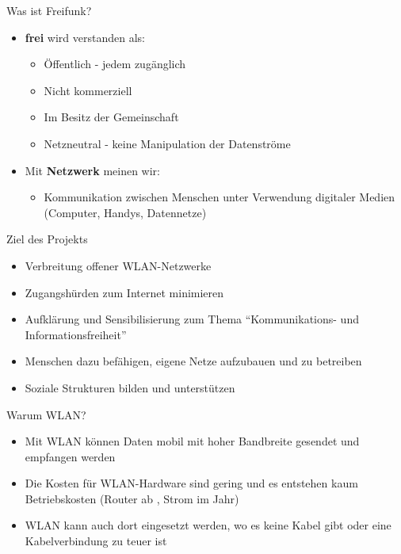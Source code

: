\documentclass[c]{beamer}
\begin{document}
\begin{frame}{Was ist Freifunk?}
\begin{itemize}
	\item \textbf{frei} wird verstanden als:
	\begin{itemize}
		\item Öffentlich - jedem zugänglich
		\item Nicht kommerziell
		\item Im Besitz der Gemeinschaft
		\item Netzneutral - keine Manipulation der Datenströme
	\end{itemize}
	\item Mit \textbf{Netzwerk} meinen wir:
	\begin{itemize}
		\item Kommunikation zwischen Menschen unter Verwendung digitaler Medien (Computer, Handys, Datennetze)
	\end{itemize}
  \end{itemize}
\end{frame}

\begin{frame}{Ziel des Projekts}
	\begin{itemize}
		\item Verbreitung offener WLAN-Netzwerke
		\item Zugangshürden zum Internet minimieren
		\item Aufklärung und Sensibilisierung zum Thema ``Kommunikations- und Informationsfreiheit''
		\item Menschen dazu befähigen, eigene Netze aufzubauen und zu betreiben
		\item Soziale Strukturen bilden und unterstützen
	\end{itemize}
\end{frame}

\begin{frame}{Warum WLAN?}
	\begin{itemize}
		\item Mit WLAN können Daten mobil mit hoher Bandbreite gesendet und empfangen werden
		\item Die Kosten für WLAN-Hardware sind gering und es entstehen kaum Betriebskosten (Router ab , Strom  im Jahr)
		\item WLAN kann auch dort eingesetzt werden, wo es keine Kabel gibt oder eine Kabelverbindung zu teuer ist
	\end{itemize}
\end{frame}
\end{document}
